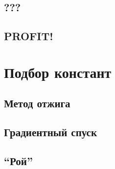 \documentclass{beamer}
\begin{document}
		\subsection{???}
		\subsection{PROFIT!}


\section{Подбор констант}
	\subsection{Метод отжига}\frame{}
	\subsection{Градиентный спуск}\frame{}
	\subsection{``Рой''}\frame{}
	
\end{document}
